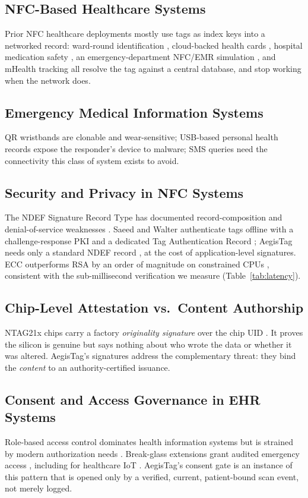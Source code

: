 \documentclass[conference]{IEEEtran}
\begin{document}
\subsection{NFC-Based Healthcare Systems}
Prior NFC healthcare deployments mostly use tags as index keys into a networked record: ward-round identification \cite{kostinger2013}, cloud-backed health cards \cite{ukalkar2017}, hospital medication safety \cite{lahtela2008}, an emergency-department NFC/EMR simulation \cite{jung2018}, and mHealth tracking \cite{ebere2022} all resolve the tag against a central database, and stop working when the network does.

\subsection{Emergency Medical Information Systems}
QR wristbands are clonable and wear-sensitive; USB-based personal health records \cite{marupally2009} expose the responder's device to malware; SMS queries need the connectivity this class of system exists to avoid.

\subsection{Security and Privacy in NFC Systems}
The NDEF Signature Record Type has documented record-composition and denial-of-service weaknesses \cite{roland2011}. Saeed and Walter authenticate tags offline with a challenge-response PKI and a dedicated Tag Authentication Record \cite{saeed2012}; AegisTag needs only a standard NDEF record \cite{ndef_spec}, at the cost of application-level signatures. ECC outperforms RSA by an order of magnitude on constrained CPUs \cite{gura2004}, consistent with the sub-millisecond verification we measure (Table~\ref{tab:latency}).

\subsection{Chip-Level Attestation vs.\ Content Authorship}
NTAG21x chips carry a factory \emph{originality signature} over the chip UID \cite{nxp_ntag_datasheet}. It proves the silicon is genuine but says nothing about who wrote the data or whether it was altered. AegisTag's signatures address the complementary threat: they bind the \emph{content} to an authority-certified issuance.

\subsection{Consent and Access Governance in EHR Systems}
Role-based access control dominates health information systems but is strained by modern authorization needs \cite{decarvalho2018}. Break-glass extensions grant audited emergency access \cite{brucker2009}, including for healthcare IoT \cite{yang2018}. AegisTag's consent gate is an instance of this pattern that is opened only by a verified, current, patient-bound scan event, not merely logged.
\end{document}

